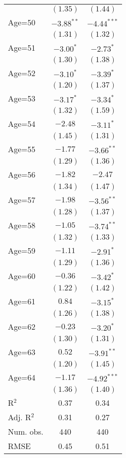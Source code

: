 \documentclass[fullpage]{paper}
\begin{document}
\begin{center}
\begin{longtable}{l c c }
            & $(1.35)$      & $(1.44)$      \\
Age=50      & $-3.88^{**}$  & $-4.44^{***}$ \\
            & $(1.31)$      & $(1.32)$      \\
Age=51      & $-3.00^{*}$   & $-2.73^{*}$   \\
            & $(1.30)$      & $(1.38)$      \\
Age=52      & $-3.10^{*}$   & $-3.39^{*}$   \\
            & $(1.20)$      & $(1.37)$      \\
Age=53      & $-3.17^{*}$   & $-3.34^{*}$   \\
            & $(1.32)$      & $(1.59)$      \\
Age=54      & $-2.48$       & $-3.11^{*}$   \\
            & $(1.45)$      & $(1.31)$      \\
Age=55      & $-1.77$       & $-3.66^{**}$  \\
            & $(1.29)$      & $(1.36)$      \\
Age=56      & $-1.82$       & $-2.47$       \\
            & $(1.34)$      & $(1.47)$      \\
Age=57      & $-1.98$       & $-3.56^{**}$  \\
            & $(1.28)$      & $(1.37)$      \\
Age=58      & $-1.05$       & $-3.74^{**}$  \\
            & $(1.32)$      & $(1.33)$      \\
Age=59      & $-1.11$       & $-2.91^{*}$   \\
            & $(1.29)$      & $(1.36)$      \\
Age=60      & $-0.36$       & $-3.42^{*}$   \\
            & $(1.22)$      & $(1.42)$      \\
Age=61      & $0.84$        & $-3.15^{*}$   \\
            & $(1.26)$      & $(1.38)$      \\
Age=62      & $-0.23$       & $-3.20^{*}$   \\
            & $(1.30)$      & $(1.31)$      \\
Age=63      & $0.52$        & $-3.91^{**}$  \\
            & $(1.20)$      & $(1.45)$      \\
Age=64      & $-1.17$       & $-4.92^{***}$ \\
            & $(1.36)$      & $(1.40)$      \\
\hline
R$^2$       & 0.37          & 0.34          \\
Adj. R$^2$  & 0.31          & 0.27          \\
Num. obs.   & 440           & 440           \\
RMSE        & 0.45          & 0.51          \\
\end{longtable}
\end{center}
\end{document}
